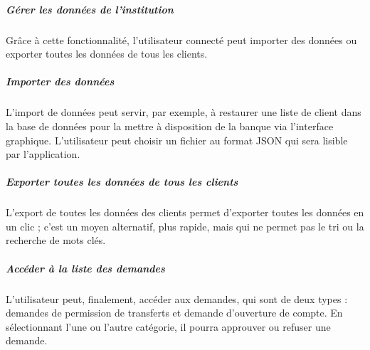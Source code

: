 \subparagraph{Gérer les données de l'institution}
Grâce à cette fonctionnalité, l'utilisateur connecté peut importer des données ou exporter toutes les données de tous les clients.


\subparagraph{Importer des données}
L'import de données peut servir, par exemple, à restaurer une liste de client dans la base de données pour la mettre à disposition de la banque via l'interface graphique. L'utilisateur peut choisir un fichier au format JSON qui sera lisible par l'application.


\subparagraph{Exporter toutes les données de tous les clients}
L'export de toutes les données des clients permet d'exporter toutes les données en un clic ; c'est un moyen alternatif, plus rapide, mais qui ne permet pas le tri ou la recherche de mots clés.


\subparagraph{Accéder à la liste des demandes}
L'utilisateur peut, finalement, accéder aux demandes, qui sont de deux types : demandes de permission de transferts et demande d'ouverture de compte. En sélectionnant l'une ou l'autre catégorie, il pourra approuver ou refuser une demande.